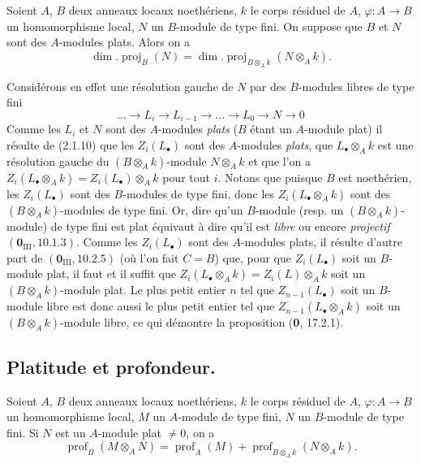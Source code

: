 
\begin{proposition}[6.2.3]
Soient $A$, $B$ deux anneaux locaux noethériens, $k$ le corps résiduel de
$A$, $\varphi:A\to B$ un homomorphisme local, $N$ un $B$-module de type fini.
On suppose que $B$ et $N$ sont des $A$-modules plats. Alors on a
\begin{equation}
\dim.\operatorname{proj}_B(N)
=\dim.\operatorname{proj}_{B\otimes_Ak}(N\otimes_Ak).
\tag{6.2.3.1}\label{IV.2.s6.2.3.1-fr}
\end{equation}
\end{proposition}

Considérons en effet une résolution gauche de $N$ par des $B$-modules libres
de type fini
\[
\ldots\to L_i\to L_{i-1}\to\ldots\to L_0\to N\to0
\]
Comme les $L_i$ et $N$ sont des $A$-modules \emph{plats} ($B$ étant un $A$-module
plat) il résulte de (2.1.10) que les $Z_i(L_\bullet)$ sont des $A$-modules
\emph{plats}, que $L_\bullet\otimes_Ak$ est une résolution gauche du
$(B\otimes_Ak)$-module $N\otimes_Ak$ et que l'on a
$Z_i(L_\bullet\otimes_Ak)=Z_i(L_\bullet)\otimes_Ak$ pour tout $i$. Notons que
puisque $B$ est noethérien, les $Z_i(L_\bullet)$ sont des $B$-modules de type
fini, donc les $Z_i(L_\bullet\otimes_Ak)$ sont des $(B\otimes_Ak)$-modules de
type fini. Or, dire qu'un $B$-module (resp. un $(B\otimes_Ak)$-module) de type
fini est plat équivaut à dire qu'il est \emph{libre} ou encore \emph{projectif}
$(\mathbf{0}_{\mathrm{III}}, 10.1.3)$. Comme les $Z_i(L_\bullet)$ sont des $A$-modules
plats, il résulte d'autre part de $(\mathbf{0}_{\mathrm{III}}, 10.2.5)$ (où l'on fait
$C=B$) que, pour que $Z_i(L_\bullet)$ soit un $B$-module plat, il faut et il
suffit que $Z_i(L_\bullet\otimes_Ak)=Z_i(L)\otimes_Ak$ soit un $(B\otimes_Ak)$-module plat. Le
plus petit entier $n$ tel que $Z_{n-1}(L_\bullet)$ soit un $B$-module libre est
donc aussi le plus petit entier tel que $Z_{n-1}(L_\bullet\otimes_Ak)$ soit un
$(B\otimes_Ak)$-module libre, ce qui démontre la proposition (\textbf{0}, 17.2.1).

\subsection{Platitude et profondeur.}

\begin{proposition}[6.3.1]
Soient $A$, $B$ deux anneaux locaux noethériens, $k$ le corps résiduel de
$A$, $\varphi:A\to B$ un homomorphisme local, $M$ un $A$-module de type fini,
$N$ un $B$-module de type fini. Si $N$ est un $A$-module plat $\neq0$, on a
\begin{equation}
\operatorname{prof}_B(M\otimes_AN)=\operatorname{prof}_A(M)
+\operatorname{prof}_{B\otimes_Ak}(N\otimes_Ak).
\tag{6.3.1.1}\label{IV.2.s6.3.1.1-fr}
\end{equation}
\end{proposition}

